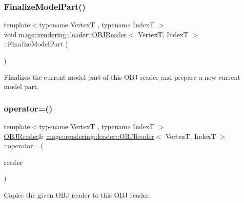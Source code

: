\subsubsection{\texorpdfstring{Finalize\+Model\+Part()}{FinalizeModelPart()}}
{\footnotesize\ttfamily template$<$typename VertexT , typename IndexT $>$ \\
void \mbox{\hyperlink{classmage_1_1rendering_1_1loader_1_1_o_b_j_reader}{mage\+::rendering\+::loader\+::\+O\+B\+J\+Reader}}$<$ VertexT, IndexT $>$\+::Finalize\+Model\+Part (\begin{DoxyParamCaption}{ }\end{DoxyParamCaption})\hspace{0.3cm}{\ttfamily [private]}}

Finalizes the current model part of this O\+BJ reader and prepare a new current model part. \mbox{\label{classmage_1_1rendering_1_1loader_1_1_o_b_j_reader_a006549a7f9724580c7fdae2f7a9c7bdf}} 
\subsubsection{\texorpdfstring{operator=()}{operator=()}\hspace{0.1cm}{\footnotesize\ttfamily [1/2]}}
{\footnotesize\ttfamily template$<$typename VertexT , typename IndexT $>$ \\
\mbox{\hyperlink{classmage_1_1rendering_1_1loader_1_1_o_b_j_reader}{O\+B\+J\+Reader}}\& \mbox{\hyperlink{classmage_1_1rendering_1_1loader_1_1_o_b_j_reader}{mage\+::rendering\+::loader\+::\+O\+B\+J\+Reader}}$<$ VertexT, IndexT $>$\+::operator= (\begin{DoxyParamCaption}\item[{const \mbox{\hyperlink{classmage_1_1rendering_1_1loader_1_1_o_b_j_reader}{O\+B\+J\+Reader}}$<$ VertexT, IndexT $>$ \&}]{reader }\end{DoxyParamCaption})\hspace{0.3cm}{\ttfamily [delete]}}

Copies the given O\+BJ reader to this O\+BJ reader.


